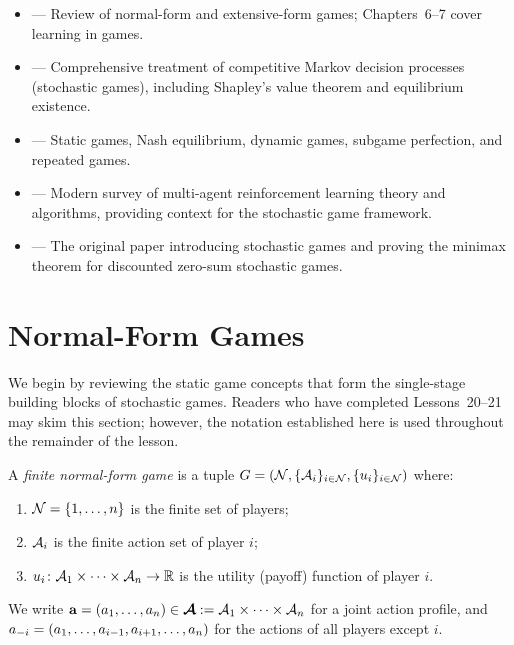 \documentclass[11pt,a4paper]{article}
\begin{document}
\begin{itemize}
  \item \citet[Chapters 3--4]{shoham2008} --- Review of normal-form
    and extensive-form games; Chapters~6--7 cover learning in games.
  \item \citet[Chapters 1--5]{filar1997} --- Comprehensive treatment
    of competitive Markov decision processes (stochastic games),
    including Shapley's value theorem and equilibrium existence.
  \item \citet[Chapters 1--3]{fudenberg1991} --- Static games, Nash
    equilibrium, dynamic games, subgame perfection, and repeated
    games.
  \item \citet{zhang2021} --- Modern survey of multi-agent
    reinforcement learning theory and algorithms, providing context
    for the stochastic game framework.
  \item \citet{shapley1953} --- The original paper introducing
    stochastic games and proving the minimax theorem for discounted
    zero-sum stochastic games.
\end{itemize}

\section{Normal-Form Games}
\label{sec:normal-form}

We begin by reviewing the static game concepts that form the
single-stage building blocks of stochastic games.  Readers who have
completed Lessons~20--21 may skim this section; however, the notation
established here is used throughout the remainder of the lesson.

\begin{definition}
\label{def:normal-form}
A \emph{finite normal-form game} is a tuple
$G = (\mathcal{N}, \{\mathcal{A}_i\}_{i \in \mathcal{N}},
\{u_i\}_{i \in \mathcal{N}})$ where:
\begin{enumerate}[nosep]
  \item $\mathcal{N} = \{1, \ldots, n\}$ is the finite set of players;
  \item $\mathcal{A}_i$ is the finite action set of player $i$;
  \item $u_i \colon \mathcal{A}_1 \times \cdots \times \mathcal{A}_n \to \mathbb{R}$
    is the utility (payoff) function of player $i$.
\end{enumerate}
We write $\mathbf{a} = (a_1, \ldots, a_n) \in
\boldsymbol{\mathcal{A}} := \mathcal{A}_1 \times \cdots \times \mathcal{A}_n$
for a joint action profile, and $a_{-i} = (a_1, \ldots, a_{i-1},
a_{i+1}, \ldots, a_n)$ for the actions of all players except $i$.
\end{definition}
\end{document}
